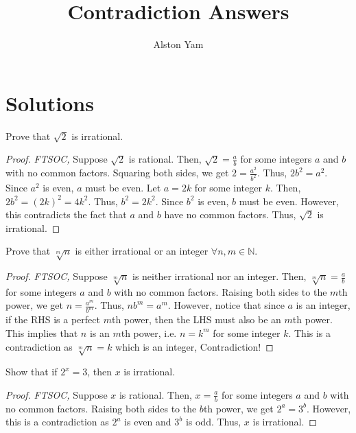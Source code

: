 \documentclass{article}
\title{Contradiction Answers}
\author{Alston Yam}
\theoremstyle{mytheoremstyle}
\theoremstyle{mytheoremstyle}
\theoremstyle{myproblemstyle}
\begin{document}
    \maketitle
    \section{Solutions}
    \begin{problem}
        Prove that $\sqrt{2}$ is irrational.
    \end{problem}

    \begin{proof}
        \textit{FTSOC,} Suppose $\sqrt{2}$ is rational. Then, $\sqrt{2} = \frac{a}{b}$ for some integers $a$ and $b$ with no common factors. Squaring both sides, we get $2 = \frac{a^2}{b^2}$. Thus, $2b^2 = a^2$. Since $a^2$ is even, $a$ must be even. Let $a = 2k$ for some integer $k$. Then, $2b^2 = {(2k)}^2 = 4k^2$. Thus, $b^2 = 2k^2$. Since $b^2$ is even, $b$ must be even. However, this contradicts the fact that $a$ and $b$ have no common factors. Thus, $\sqrt{2}$ is irrational.
    \end{proof}

    \begin{problem}
        Prove that $\sqrt[m]{n}$ is either irrational or an integer $\forall n, m \in \mathbb{N}$.
    \end{problem}

    \begin{proof}
        \textit{FTSOC,} Suppose $\sqrt[m]{n}$ is neither irrational nor an integer. Then, $\sqrt[m]{n} = \frac{a}{b}$ for some integers $a$ and $b$ with no common factors. Raising both sides to the $m$th power, we get $n = \frac{a^m}{b^m}$. Thus, $nb^m = a^m$. However, notice that since $a$ is an integer, if the RHS is a perfect $m$th power, then the LHS must also be an $m$th power. This implies that $n$ is an $m$th power, i.e. $n = k^m$ for some integer $k$. This is a contradiction as $\sqrt[m]{n} = k$ which is an integer, Contradiction!
    \end{proof}

    \begin{problem}
        Show that if $2^x = 3$, then $x$ is irrational.
    \end{problem}

    \begin{proof}
        \textit{FTSOC,} Suppose $x$ is rational. Then, $x = \frac{a}{b}$ for some integers $a$ and $b$ with no common factors. Raising both sides to the $b$th power, we get $2^a = 3^b$. However, this is a contradiction as $2^a$ is even and $3^b$ is odd. Thus, $x$ is irrational.
    \end{proof}
\end{document}
